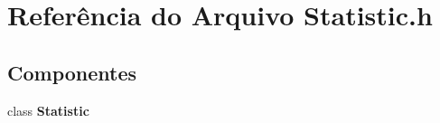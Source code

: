 \section{Referência do Arquivo Statistic.\+h}
\label{_statistic_8h}
\subsection*{Componentes}
\begin{DoxyCompactItemize}
\item 
class {\bf Statistic}
\end{DoxyCompactItemize}
